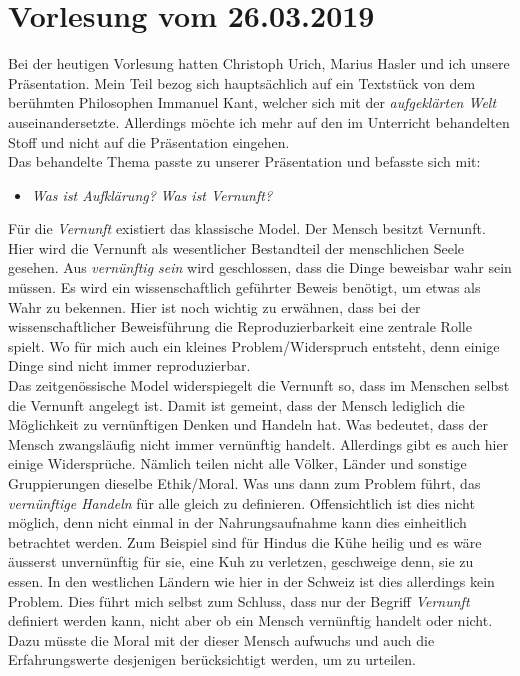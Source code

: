 \section{Vorlesung vom 26.03.2019}
Bei der heutigen Vorlesung hatten Christoph Urich, Marius Hasler und ich unsere Präsentation. Mein Teil bezog sich hauptsächlich auf ein Textstück von dem berühmten Philosophen Immanuel Kant, welcher sich mit der \textit{aufgeklärten Welt} auseinandersetzte. Allerdings möchte ich mehr auf den im Unterricht behandelten Stoff und nicht auf die Präsentation eingehen.\\

Das behandelte Thema passte zu unserer Präsentation und befasste sich mit:\\
\begin{itemize}
	\centering
	\item[ ] \glqq \textit{Was ist Aufklärung?}\textit{ Was ist Vernunft?}\grqq\\
\end{itemize}

Für die \textit{Vernunft} existiert das klassische Model. \glqq Der Mensch besitzt Vernunft\grqq. Hier wird die Vernunft als wesentlicher Bestandteil der menschlichen Seele gesehen. Aus \textit{vernünftig sein} wird geschlossen, dass die Dinge beweisbar wahr sein müssen. Es wird ein wissenschaftlich geführter Beweis benötigt, um etwas als Wahr zu bekennen. Hier ist noch wichtig zu erwähnen, dass bei der wissenschaftlicher Beweisführung die Reproduzierbarkeit eine zentrale Rolle spielt. Wo für mich auch ein kleines Problem/Widerspruch entsteht, denn einige Dinge sind nicht immer reproduzierbar. \\

Das zeitgenössische Model widerspiegelt die Vernunft so, dass im Menschen selbst die Vernunft angelegt ist. Damit ist gemeint, dass der Mensch lediglich die Möglichkeit zu vernünftigen Denken und Handeln hat. Was bedeutet, dass der Mensch zwangsläufig nicht immer vernünftig handelt. Allerdings gibt es auch hier einige Widersprüche. Nämlich teilen nicht alle Völker, Länder und sonstige Gruppierungen dieselbe Ethik/Moral. Was uns dann zum Problem führt, das \textit{vernünftige Handeln} für alle gleich zu definieren. Offensichtlich ist dies nicht möglich, denn nicht einmal in der Nahrungsaufnahme kann dies einheitlich betrachtet werden. Zum Beispiel sind für Hindus die Kühe heilig und es wäre äusserst unvernünftig für sie, eine Kuh zu verletzen, geschweige denn, sie zu essen. In den westlichen Ländern wie hier in der Schweiz ist dies allerdings kein Problem. Dies führt mich selbst zum Schluss, dass nur der Begriff \textit{Vernunft} definiert werden kann, nicht aber ob ein Mensch vernünftig handelt oder nicht. Dazu müsste die Moral mit der dieser Mensch aufwuchs und auch die Erfahrungswerte desjenigen berücksichtigt werden, um zu urteilen.\\


